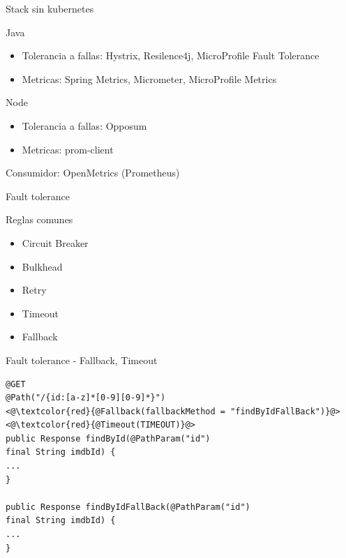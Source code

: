 \documentclass[aspectratio=169]{beamer}
\begin{document}
\begin{frame}{Stack sin kubernetes}


Java
\begin{itemize}
\item Tolerancia a fallas: Hystrix, Resilence4j, MicroProfile Fault Tolerance
\item Metricas: Spring Metrics, Micrometer, MicroProfile Metrics
\end{itemize}


Node
\begin{itemize}
\item Tolerancia a fallas: Opposum
\item Metricas: prom-client
\end{itemize}


Consumidor: OpenMetrics (Prometheus)
\end{frame}


\begin{frame}{Fault tolerance}

Reglas comunes
\begin{itemize}
\item Circuit Breaker
\item Bulkhead
\item Retry
\item Timeout
\item Fallback
\end{itemize}

\end{frame}

\begin{frame}[fragile]{Fault tolerance - Fallback, Timeout}
\begin{lstlisting}
@GET
@Path("/{id:[a-z]*[0-9][0-9]*}")
<@\textcolor{red}{@Fallback(fallbackMethod = "findByIdFallBack")}@>
<@\textcolor{red}{@Timeout(TIMEOUT)}@>
public Response findById(@PathParam("id")
final String imdbId) {
...
}

public Response findByIdFallBack(@PathParam("id")
final String imdbId) {
...
}
\end{lstlisting}
\end{frame}
\end{document}
